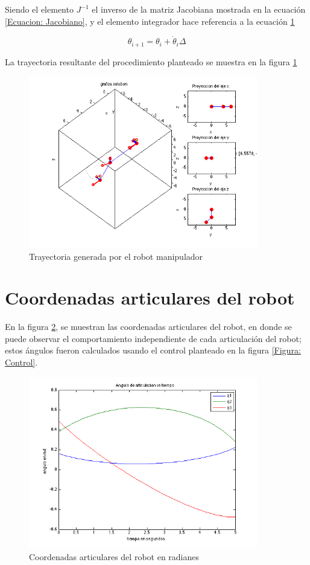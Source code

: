 \documentclass[11pt]{report} %
\begin{document}
	Siendo el elemento ${J}^{-1}$ el inverso de la matriz Jacobiana mostrada en la ecuación \ref{Ecuacion: Jacobiano}, y el elemento integrador hace referencia a la ecuación \ref{}

	\begin{equation}
		{\theta}_{i + 1} = {\theta}_{i} + {\dot{\theta}}_{i} \Delta
	\end{equation}

	La trayectoria resultante del procedimiento planteado se muestra en la figura \ref{Figura: Trayectoria}

	\begin{figure}[H]
		\centering
		\includegraphics[width=10cm]{Imagenes/robot.png}
		\caption{Trayectoria generada por el robot manipulador}
		\label{Figura: Trayectoria}
	\end{figure}

	\section{Coordenadas articulares del robot}

	En la figura \ref{Figura: angulo}, se muestran las coordenadas articulares del robot, en donde se puede observar el comportamiento independiente de cada articulación del robot; estos ángulos fueron calculados usando el control planteado en la figura \ref{Figura: Control}.

	\begin{figure}[H]
		\centering
		\includegraphics[width=10cm]{Imagenes/angulo.png}
		\caption{Coordenadas articulares del robot en radianes}
		\label{Figura: angulo}
	\end{figure}
\end{document}
